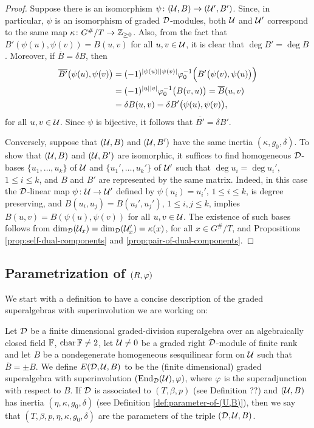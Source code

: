 \begin{proof}
    Suppose there is an isomorphism $\psi\colon (\mathcal U, B) \to (\mathcal U', B')$.
    Since, in particular, $\psi$ is an isomorphism of graded $\mathcal{D}$-modules, both $\mathcal U$ and $\mathcal U'$ correspond to the same map $\kappa\colon G^\#/T \to \mathbb{Z}_{\geq 0}$. 
    Also, from the fact that $B'(\psi(u), \psi(v)) = B(u, v)$ for all $u, v\in \mathcal U$, it is clear that $\deg B' = \deg B$.
    Moreover, if $\overline{B} = \delta B$, then
    \begin{align*}
        \overline{B'} \big(\psi(u), \psi(v) \big) &= (-1)^{|\psi(u)||\psi(v)|} \varphi_0^{-1} \Big( B'\big( \psi(v) , \psi(u) \big) \Big) \\
        &= (-1)^{|u||v|} \varphi_0^{-1} \big( B(v, u) \big) 
        = \overline{B} (u, v) \\
        &= \delta B(u, v) = \delta B' \big( \psi(u), \psi(v) \big),
    \end{align*}
    for all $u, v \in \mathcal U$. 
    Since $\psi$ is bijective, it follows that $\overline{B'} = \delta B'$. 
    
    Conversely, suppose that $(\mathcal U, B)$ and $(\mathcal U, B')$ have the same inertia $(\kappa, g_0, \delta)$. 
    To show that $(\mathcal U, B)$ and $(\mathcal U, B')$ are isomorphic, it suffices to find homogeneous $\mathcal{D}$-bases $\{u_1, \ldots, u_k\}$ of $\mathcal U$ and $\{u_1', \ldots, u_k'\}$ of $\mathcal U'$ such that $\deg u_i = \deg u_i'$, $1 \leq i \leq k$, and $B$ and $B'$ are represented by the same matrix. 
    Indeed, in this case the $\mathcal{D}$-linear map $\psi\colon \mathcal U \to \mathcal U'$ defined by $\psi(u_i) = u_i'$, $1 \leq i \leq k$, is degree preserving, and $B(u_i, u_j) = B(u_i', u_j')$, $1 \leq i,j \leq k$, implies $B(u, v) = B( \psi(u), \psi(v) )$ for all $u, v\in \mathcal U$. 
    The existence of such bases follows from $\dim_{\mathcal{D}} (\mathcal U_x) = \dim_{\mathcal{D}} (\mathcal U_x') = \kappa(x)$, for all $x \in G^\#/T$, and Propositions \ref{prop:self-dual-components} and \ref{prop:pair-of-dual-components}. 
\end{proof}


\subsection{Parametrization of $(R, \varphi)$}

We start with a definition to have a concise description of the graded superalgebras with superinvolution we are working on:


\begin{defi}\label{def:E(D,U,B)}
    Let $\mathcal{D}$ be a finite dimensional graded-division superalgebra over an algebraically closed field $\mathbb{F}$, $\operatorname{char} \mathbb{F} \neq 2$, let $\mathcal U\neq 0$ be a graded right $\mathcal{D}$-module of finite rank and  let $B$ be a nondegenerate homogeneous sesquilinear form on $\mathcal U$ such that $\overline{B} = \pm B$. 
    We define $E(\mathcal{D}, \mathcal U, B)$ to be the (finite dimensional) graded superalgebra with superinvolution $(\operatorname{End}_{\mathcal{D}}(\mathcal U), \varphi)$, where $\varphi$ is the superadjunction with respect to $B$. 
    If $\mathcal{D}$ is associated to $(T, \beta, p)$ (see Definition ??) and $(\mathcal U, B)$ has inertia $(\eta, \kappa, g_0, \delta)$ (see Definition \ref{def:parameter-of-(U,B)}), then we say that $(T, \beta, p, \eta, \kappa, g_0, \delta)$ are the parameters of the triple $(\mathcal{D}, \mathcal U, B)$. 
\end{defi}

